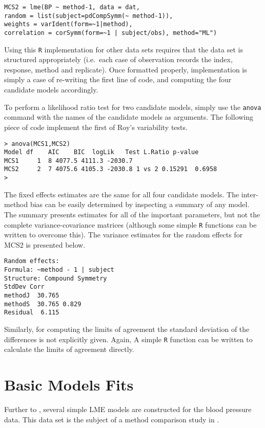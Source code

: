 \documentclass[12pt, a4paper]{report}
\theoremstyle{plain}
\theoremstyle{definition}
\theoremstyle{remark}
\begin{document}
\begin{verbatim}
MCS2 = lme(BP ~ method-1, data = dat,
random = list(subject=pdCompSymm(~ method-1)),
weights = varIdent(form=~1|method),
correlation = corSymm(form=~1 | subject/obs), method="ML")
\end{verbatim}

\vspace{1cm}
Using this \texttt{R} implementation for other data sets requires that the data set is structured appropriately (i.e.\ each case of observation records the index, response, method and replicate). Once formatted properly, implementation is simply a case of re-writing the first line of code, and computing the four candidate models accordingly.

To perform a likelihood ratio test for two candidate models, simply use the \texttt{anova} command with the names of the candidate models as arguments. The following piece of code implement the first of Roy's variability tests.


\begin{verbatim}
> anova(MCS1,MCS2)
Model df    AIC    BIC  logLik   Test L.Ratio p-value
MCS1     1  8 4077.5 4111.3 -2030.7
MCS2     2  7 4075.6 4105.3 -2030.8 1 vs 2 0.15291  0.6958
>
\end{verbatim}

The fixed effects estimates are the same for all four candidate models. The inter-method bias can be easily determined by inspecting a summary of any model. The summary presents estimates for all of the important parameters, but not the complete variance-covariance matrices (although some simple \texttt{R} functions can be written to overcome this). The variance estimates for the random effects for MCS2 is presented below.

\begin{verbatim}
Random effects:
Formula: ~method - 1 | subject
Structure: Compound Symmetry
StdDev Corr
methodJ  30.765
methodS  30.765 0.829
Residual  6.115
\end{verbatim}

Similarly, for computing the limits of agreement the standard deviation of the differences is not explicitly given. Again, A simple \texttt{R} function can be written to calculate the limits of agreement directly.



	
	


	\section{Basic Models Fits}
	Further to \citet{PB}, several simple LME models are constructed
	for the blood pressure data. This data set is the subject of a
	method comparison study in \citet{BA99}.
	
\end{document}
